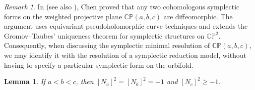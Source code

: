 \documentclass[11pt]{article}
\newtheorem{lemma}[theorem]{Lemma}
\theoremstyle{definition}
\theoremstyle{remark}
\newtheorem{remark}[theorem]{Remark}
\newcommand{\CP}{\mathbb{CP}}
\begin{document}
\begin{remark}\label{rmk:chen}
 In \cite[Theorem 2.6]{Chen09} (see also \cite{Mcduff09}), Chen proved that any two cohomologous symplectic forms on the weighted projective plane $\CP(a,b,c)$ are diffeomorphic. The argument uses equivariant pseudoholomorphic curve techniques and extends the Gromov--Taubes' uniqueness theorem for symplectic structures on $\CP^2$. Consequently, when discussing the symplectic minimal resolution of $\CP(a,b,c)$, we may identify it with the resolution of a symplectic reduction model, without having to specify a particular symplectic form on the orbifold.
\end{remark}

\begin{lemma}\label{lem:threeedges}
  If $a<b<c$, then $[N_a]^2=[N_b]^2=-1$ and $[N_c]^2\geq -1$.
\end{lemma}
\end{document}
